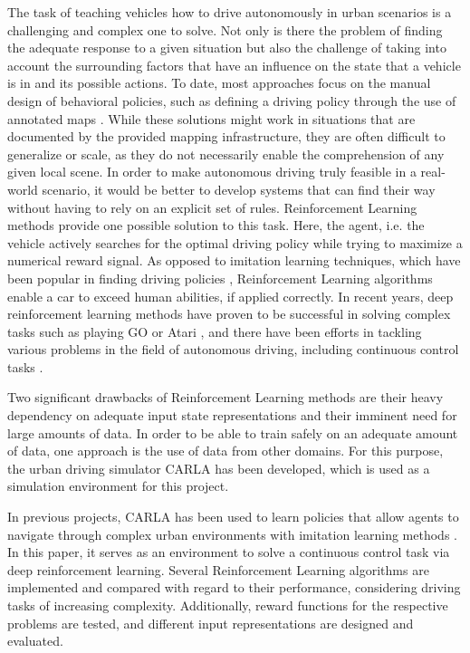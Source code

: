 \documentclass[letterpaper, 10 pt, conference]{ieeeconf}  %
\begin{document}

The task of teaching vehicles how to drive autonomously in urban scenarios is a 
challenging and complex one to solve. Not only is there the problem of finding the adequate 
response to a given situation but also the challenge of taking into account the surrounding 
factors that have an influence on the state that a vehicle is in and its possible actions. 
To date, most approaches focus on the manual design of behavioral policies, such as defining a 
driving policy through the use of annotated maps \cite{7339478}. While these solutions might work in 
situations that are documented by the provided mapping infrastructure, they are often difficult to 
generalize or scale, as they do not necessarily enable the comprehension of any given local scene. 
In order to make autonomous driving truly feasible in a real-world scenario, it would be better to 
develop systems that can find their way without having to rely on an explicit set of rules. 
Reinforcement Learning methods provide one possible solution to this task. Here, the agent, 
i.e. the vehicle actively searches for the optimal driving policy while trying to maximize a 
numerical reward signal. As opposed to imitation learning techniques, which have been popular 
in finding driving policies \cite{kendall2019learning}, Reinforcement Learning algorithms enable 
a car to exceed human abilities, if applied correctly. In recent years, deep reinforcement learning 
methods have proven to be successful in solving complex tasks such as playing GO \cite{44806} or 
Atari \cite{mnih2013playing}, and there have been efforts in tackling various problems in the field 
of autonomous driving, including continuous control tasks \cite{lillicrapContinuousControlDeep2015}.

Two significant drawbacks of Reinforcement Learning methods are their heavy dependency on adequate 
input state representations \cite{DBLP:journals/corr/abs-1904-09503} and their imminent need for 
large amounts of data. In order to be able to 
train safely on an adequate amount of data, one approach is the use of data from other domains. For this purpose, 
the urban driving simulator CARLA has been developed, which is used as a simulation environment for this project.

In previous projects, CARLA has been used to learn policies that allow agents to navigate through complex urban 
environments with imitation learning methods \cite{DBLP:journals/corr/abs-1710-02410}\cite{DBLP:journals/corr/abs-1903-00640}. 
In this paper, it serves as an environment to solve a continuous control task via deep reinforcement learning. 
Several Reinforcement Learning algorithms are implemented and compared with regard to their 
performance, considering driving tasks of increasing complexity. Additionally, reward functions for the respective 
problems are tested, and different input representations are designed and evaluated.
\end{document}
